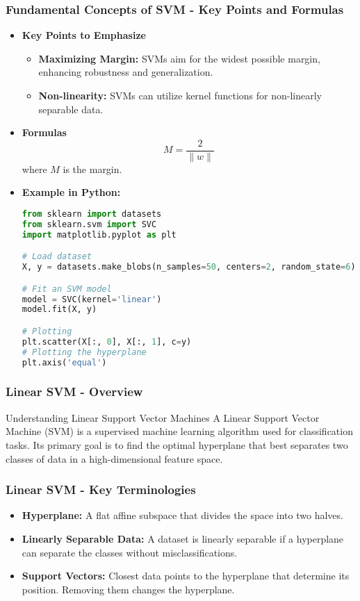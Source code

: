 \documentclass{beamer}
\begin{document}
\begin{frame}[fragile]
    \frametitle{Fundamental Concepts of SVM - Key Points and Formulas}
    \begin{itemize}
        \item \textbf{Key Points to Emphasize}
        \begin{itemize}
            \item \textbf{Maximizing Margin:} SVMs aim for the widest possible margin, enhancing robustness and generalization.
            \item \textbf{Non-linearity:} SVMs can utilize kernel functions for non-linearly separable data.
        \end{itemize}

        \item \textbf{Formulas}
        \begin{equation}
            M = \frac{2}{\|w\|}
        \end{equation}
        where \( M \) is the margin.

        \item \textbf{Example in Python:}
        \begin{lstlisting}[language=Python]
from sklearn import datasets
from sklearn.svm import SVC
import matplotlib.pyplot as plt

# Load dataset
X, y = datasets.make_blobs(n_samples=50, centers=2, random_state=6)

# Fit an SVM model
model = SVC(kernel='linear')
model.fit(X, y)

# Plotting
plt.scatter(X[:, 0], X[:, 1], c=y)
# Plotting the hyperplane
plt.axis('equal')
        \end{lstlisting}
    \end{itemize}
\end{frame}

\begin{frame}[fragile]
    \frametitle{Linear SVM - Overview}
    \begin{block}{Understanding Linear Support Vector Machines}
        A Linear Support Vector Machine (SVM) is a supervised machine learning algorithm used for classification tasks. Its primary goal is to find the optimal hyperplane that best separates two classes of data in a high-dimensional feature space.
    \end{block}
\end{frame}

\begin{frame}[fragile]
    \frametitle{Linear SVM - Key Terminologies}
    \begin{itemize}
        \item \textbf{Hyperplane:} A flat affine subspace that divides the space into two halves. 
        \item \textbf{Linearly Separable Data:} A dataset is linearly separable if a hyperplane can separate the classes without misclassifications.
        \item \textbf{Support Vectors:} Closest data points to the hyperplane that determine its position. Removing them changes the hyperplane.
    \end{itemize}
\end{frame}
\end{document}

